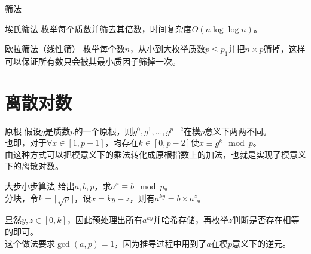 \documentclass{beamer}
\begin{document}
	\begin{frame}{筛法}
		\begin{block}{埃氏筛法}
			枚举每个质数并筛去其倍数，时间复杂度$O(n\log\log n)$。
		\end{block}
		\begin{block}{欧拉筛法（线性筛）}
			枚举每个数$n$，从小到大枚举质数$p \le p_1$并把$n\times p$筛掉，这样可以保证所有数只会被其最小质因子筛掉一次。
		\end{block}
	\end{frame}
	\section{离散对数}
	\begin{frame}{原根}
		假设$g$是质数$p$的一个原根，则$g^0,g^1,...,g^{p-2}$在模$p$意义下两两不同。
		\\
		
		也即，对于$\forall x\in[1,p-1]$，均存在$k\in[0,p-2]$使$x \equiv g^k \mod p$。
		\\
		
		由这种方式可以把模意义下的乘法转化成原根指数上的加法，也就是实现了模意义下的离散对数。
		
	\end{frame}
	\begin{frame}{大步小步算法}
		给出$a,b,p$，求$a^x \equiv b \mod p$。
		\pause\\
		
		分块，令$k=\lceil\sqrt p\rceil$，设$x=ky-z$，则有$a^{ky}=b\times a^z$。
		
		显然$y,z \in [0,k]$，因此预处理出所有$a^{ky}$并哈希存储，再枚举$z$判断是否存在相等的即可。
		\pause\\
		
		这个做法要求$\gcd(a,p)=1$，因为推导过程中用到了$a$在模$p$意义下的逆元。
	\end{frame}
\end{document}
